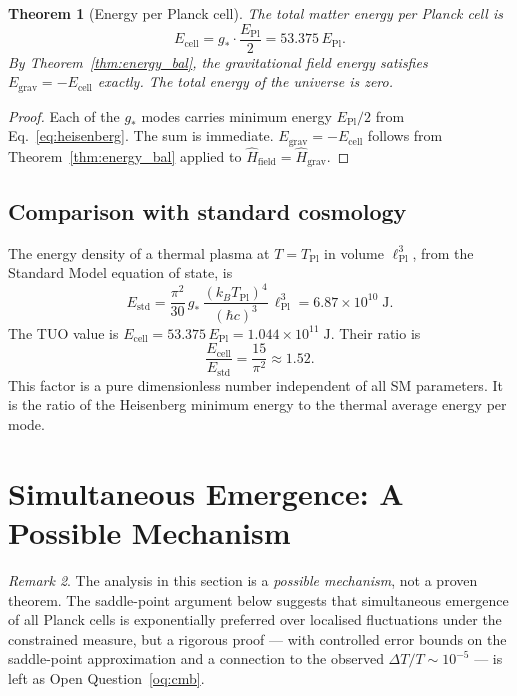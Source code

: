 \documentclass[12pt,a4paper]{article}
\newtheorem{theorem}{Theorem}[section]
\theoremstyle{definition}
\theoremstyle{remark}
\newtheorem{remark}[theorem]{Remark}
\newcommand{\EPl}{E_{\mathrm{Pl}}}
\newcommand{\lPl}{\ell_{\mathrm{Pl}}}
\newcommand{\TPl}{T_{\mathrm{Pl}}}
\newcommand{\gstar}{g_{*}}
\newcommand{\Hhat}{\hat{H}}
\begin{document}
\begin{theorem}[Energy per Planck cell]\label{thm:energy}
The total matter energy per Planck cell is
\begin{equation}\label{eq:Ecell_total}
  \boxed{E_{\mathrm{cell}} = \gstar \cdot \frac{\EPl}{2} = 53.375\,\EPl.}
\end{equation}
By Theorem~\ref{thm:energy_bal}, the gravitational field energy satisfies
$E_{\mathrm{grav}} = -E_{\mathrm{cell}}$ exactly.
The total energy of the universe is zero.
\end{theorem}
\begin{proof}
Each of the $\gstar$ modes carries minimum energy $\EPl/2$ from
Eq.~\eqref{eq:heisenberg}.
The sum is immediate.
$E_{\mathrm{grav}} = -E_{\mathrm{cell}}$ follows from Theorem~\ref{thm:energy_bal}
applied to $\Hhat_\mathrm{field} = \Hhat_\mathrm{grav}$.
\end{proof}

\subsection{Comparison with standard cosmology}

The energy density of a thermal plasma at $T = \TPl$ in volume $\lPl^3$,
from the Standard Model equation of state, is
\begin{equation}\label{eq:E_std}
  E_{\mathrm{std}}
  = \frac{\pi^2}{30}\,\gstar\,\frac{(k_B\TPl)^4}{(\hbar c)^3}\,\lPl^3
  = 6.87 \times 10^{10}\;\mathrm{J}.
\end{equation}
The TUO value is $E_\mathrm{cell} = 53.375\,\EPl = 1.044 \times 10^{11}\;\mathrm{J}$.
Their ratio is
\begin{equation}\label{eq:ratio}
  \frac{E_{\mathrm{cell}}}{E_{\mathrm{std}}} = \frac{15}{\pi^2} \approx 1.52.
\end{equation}
This factor is a pure dimensionless number independent of all SM parameters.
It is the ratio of the Heisenberg minimum energy to the thermal average energy
per mode.

\section{Simultaneous Emergence: A Possible Mechanism}
\label{sec:path_integral}

\begin{remark}
The analysis in this section is a \emph{possible mechanism}, not a proven
theorem. The saddle-point argument below suggests that simultaneous
emergence of all Planck cells is exponentially preferred over localised
fluctuations under the constrained measure, but a rigorous proof --- with
controlled error bounds on the saddle-point approximation and a
connection to the observed $\Delta T/T \sim 10^{-5}$ --- is left as
Open Question~\ref{oq:cmb}.
\end{remark}
\end{document}

